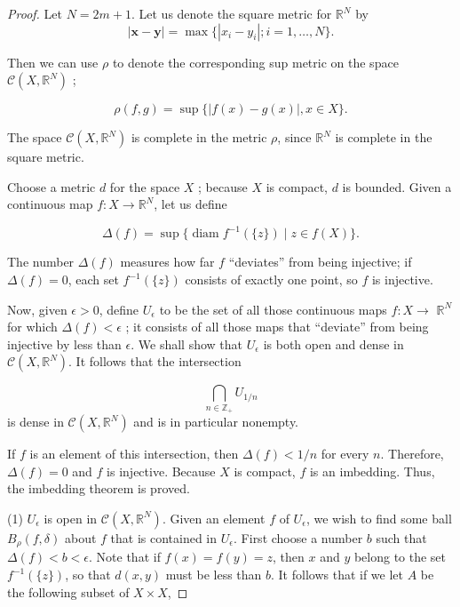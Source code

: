 \begin{proof}
Let \(N = {2m} + 1\). Let us denote the square metric for \(\mathbb{R}^{N}\) by
\[
| {\mathbf{x} - \mathbf{y}}| = \max \{ {| {x_{i} - y_{i}}| ;i = 1,\ldots, N}\}.
\]

Then we can use \(\rho\) to denote the corresponding sup metric on the space \(\mathcal{C}({X,\mathbb{R}^{N}})\) ;

\[
\rho ({f,g}) = \sup \{ | {f(x) - g(x) }|, x \in X\}.
\]

The space \(\mathcal{C}({X,\mathbb{R}^{N}})\) is complete in the metric \(\rho\), since \(\mathbb{R}^{N}\) is complete in the square metric.

Choose a metric \(d\) for the space \(X\) ; because \(X\) is compact, \(d\) is bounded. Given a continuous map \(f : X \rightarrow {\mathbb{R}}^{N}\), let us define

\[
\Delta ( f) = \sup \{ {\operatorname{diam}f^{-1}({\{ z\} }) \mid z \in f( X) }\}.
\]

The number \(\Delta ( f)\) measures how far \(f\) ``deviates'' from being injective; if \(\Delta ( f) = 0\), each set \(f^{-1}({\{ z\} })\) consists of exactly one point, so \(f\) is injective.

Now, given \(\epsilon > 0\), define \(U_{\epsilon }\) to be the set of all those continuous maps \(f : X \rightarrow\) \(\mathbb{R}^{N}\) for which \(\Delta ( f) < \epsilon\) ; it consists of all those maps that ``deviate'' from being injective by less than \(\epsilon\). We shall show that \(U_{\epsilon }\) is both open and dense in \(\mathcal{C}({X,\mathbb{R}^{N}})\). It follows that the intersection

\[
\mathop{\bigcap }\limits_{{n \in {\mathbb{Z}}_{ + }}}U_{1/n}
\]
is dense in \(\mathcal{C}({X,\mathbb{R}^{N}})\) and is in particular nonempty.

If \(f\) is an element of this intersection, then \(\Delta ( f) < 1/n\) for every \(n\). Therefore, \(\Delta ( f) = 0\) and \(f\) is injective. Because \(X\) is compact, \(f\) is an imbedding. Thus, the imbedding theorem is proved.

(1) \(U_{\epsilon }\) is open in \(\mathcal{C}({X,\mathbb{R}^{N}})\). Given an element \(f\) of \(U_{\epsilon }\), we wish to find some ball \(B_{\rho }({f,\delta })\) about \(f\) that is contained in \(U_{\epsilon }\). First choose a number \(b\) such that \(\Delta ( f) < b < \epsilon\). Note that if \(f(x) = f( y) = z\), then \(x\) and \(y\) belong to the set \(f^{-1}({\{ z\} })\), so that \(d({x,y})\) must be less than \(b\). It follows that if we let \(A\) be the following subset of \(X \times X\),


\end{proof}
